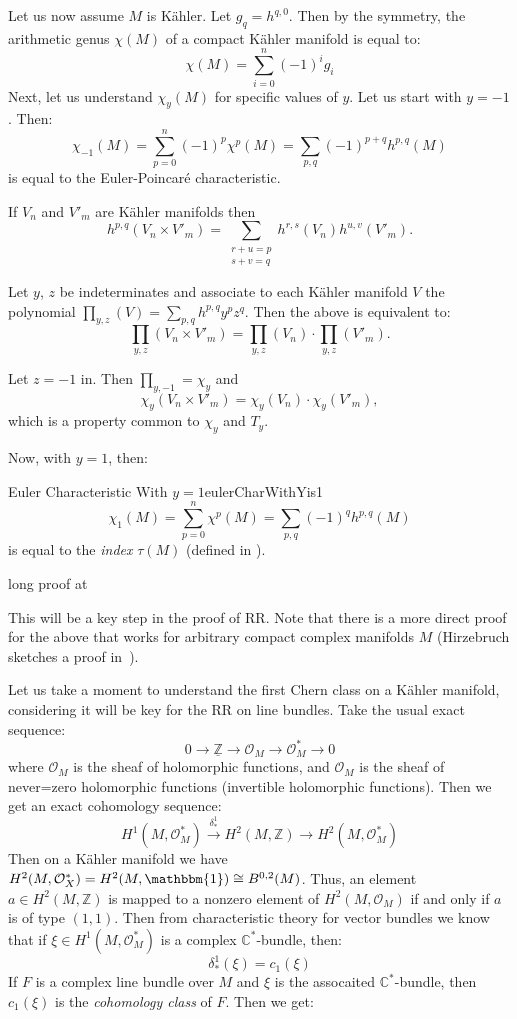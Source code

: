\documentclass{book}
\newcommand{\C}{{\mathbb{C}}}
\newcommand{\Z}{{\mathbb{Z}}}
\newcommand{\CO}{{\mathcal{O}}}
\begin{document}
Let us now assume $M$ is K\"ahler. Let $g_q = h^{q,0}$. Then by the symmetry, the arithmetic genus $\chi(M)$
of a compact K\"ahler manifold is equal to:
\[
  \chi(M) = \sum_{i=0}^n (-1)^ig_i
\]
Next, let us understand $\chi_y(M)$ for specific values of $y$. Let us start with $y = -1$. Then:
\[
  \chi_{-1}(M) = \sum_{p=0}^n (-1)^p\chi^p(M) = \sum_{p,q} (-1)^{p+q} h^{p,q}(M)
\]
is equal to the Euler-Poincar\'e characteristic.

If $V_n$ and $V'_m$ are K\"ahler manifolds then
\[
    h^{p,q}(V_n \times V'_m) = \sum_{\substack{r+u=p \\ s+v=q}} h^{r,s}(V_n) h^{u,v}(V'_m).
\]

Let $y$, $z$ be indeterminates and associate to each K\"ahler manifold $V$ the polynomial $\prod_{y,z}(V)
= \sum_{p,q} h^{p,q} y^p z^q$. Then the above is equivalent to:
\[
    \prod_{y,z}(V_n \times V'_m) = \prod_{y,z}(V_n) \cdot \prod_{y,z}(V'_m).
\]

Let $z = -1$ in. Then $\prod_{y,-1} = \chi_y$ and
\[
    \chi_y(V_n \times V'_m) = \chi_y(V_n) \cdot \chi_y(V'_m),
\]
which is a property common to $\chi_y$ and $T_y$.


Now, with $y = 1$, then:
\begin{thm}{Euler Characteristic With $y=1$}{eulerCharWithYis1}
  \[
  \chi_1(M) = \sum_{p=0}^n \chi^p(M) = \sum_{p,q}(-1)^qh^{p,q}(M)
\]
is equal to the \emph{index} $\tau(M)$ (defined in \cite[8.2]{hirzebruchTopologicalMethodsAlgebraic1995}).
\end{thm}

\begin{Proof}
  long proof at~\cite[p.125, Thm~15.8.2]{hirzebruchTopologicalMethodsAlgebraic1995}
\end{Proof}

This will be a key step in the proof of RR. Note that there is a more direct proof for the above that works
for arbitrary compact complex manifolds $M$ (Hirzebruch sketches a proof
in~\cite[appendix~25.4]{hirzebruchTopologicalMethodsAlgebraic1995}).

Let us take a moment to understand the first Chern class on a K\"ahler manifold, considering it will be key
for the RR on line bundles. Take the usual exact sequence:
\[
  0 \to \underline{\Z} \to \CO_M \to \CO_M^* \to 0
\]
where $\CO_M$ is the sheaf of holomorphic functions, and $\CO_M$ is the sheaf of never=zero holomorphic
functions (invertible holomorphic functions). Then we get an exact cohomology sequence:
\[
  H^1(M, \CO_M^*) \xrightarrow{\delta_*^1} H^2(M, \Z) \to H^2(M, \CO_M^*)
\]
Then on a K\"ahler manifold we have $H^2(M, \CO_X^*) = H^2(M, \mathbbm{1}) \cong B^{0,2}(M)$. Thus, an element
$a \in H^2(M, \Z)$ is mapped to a nonzero element of $H^2(M, \CO_M)$ if and only if $a$ is of type $(1,1)$.
Then from characteristic theory for vector bundles we know that if $\xi \in H^1(M, \CO_M^*)$ is a complex
$\C^*$-bundle, then:
\[
  \delta_*^1(\xi) = c_1(\xi)
\]
If $F$ is a complex line bundle over $M$ and $\xi$ is the assocaited $\C^*$-bundle, then $c_1(\xi)$ is the
\emph{cohomology class} of $F$. Then we get:
\end{document}
